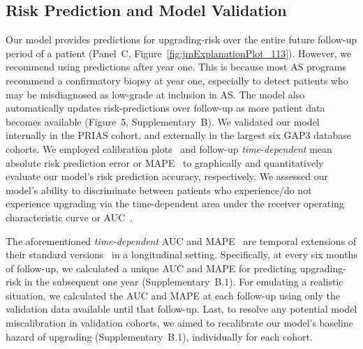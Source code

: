 \subsection{Risk Prediction and Model Validation}
Our model provides predictions for upgrading-risk over the entire future follow-up period of a patient (Panel~C, Figure~\ref{fig:jmExplanationPlot_113}). However, we recommend using predictions after year one. This is because most AS programs recommend a confirmatory biopsy at year one, especially to detect patients who may be misdiagnosed as low-grade at inclusion in AS. The model also automatically updates risk-predictions over follow-up as more patient data becomes available (Figure~5, Supplementary~B). We validated our model internally in the PRIAS cohort, and externally in the largest six GAP3 database cohorts. We employed calibration plots~\citep{royston2013external,steyerberg2010assessing} and follow-up \textit{time-dependent} mean absolute risk prediction error or MAPE~\citep{rizopoulos2017dynamic} to graphically and quantitatively evaluate our model's risk prediction accuracy, respectively. We assessed our model's ability to discriminate between patients who experience/do not experience upgrading via the time-dependent area under the receiver operating characteristic curve or AUC~\citep{rizopoulos2017dynamic}. 

The aforementioned \textit{time-dependent} AUC and MAPE~\citep{rizopoulos2017dynamic} are temporal extensions of their standard versions~\citep{steyerberg2010assessing} in a longitudinal setting. Specifically, at every six months of follow-up, we calculated a unique AUC and MAPE for predicting upgrading-risk in the subsequent one year (Supplementary~B.1). For emulating a realistic situation, we calculated the AUC and MAPE at each follow-up using only the validation data available until that follow-up. Last, to resolve any potential model miscalibration in validation cohorts, we aimed to recalibrate our model's baseline hazard of upgrading (Supplementary~B.1), individually for each cohort.